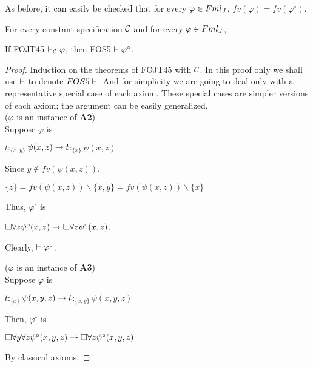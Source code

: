 \qquad As before, it can easily be checked that for every $\varphi \in Fml_{J}$,  $fv(\varphi) = fv(\varphi^{\circ})$.

\begin{pro}
For every constant specification $\mathcal{C}$ and for every $\varphi \in Fml_{J}$,
\begin{center}
If FOJT45 $\vdash_{\mathcal{C}} \varphi$, then FOS5 $\vdash \varphi^{\circ}$.
\end{center}
\end{pro}


\begin{proof}
Induction on the theorems of FOJT45 with $\mathcal{C}$. In this proof only we shall use $\vdash$ to denote $FOS5 \vdash$. And for simplicity we are going to deal only with a representative special case of each axiom. These special cases are simpler versions of each axiom; the argument can be easily generalized.\\



($\varphi$ is an instance of \textbf{A2})\\

\qquad Suppose $\varphi$ is

\begin{center}
$t$$:_{\{x,y\}}$$\psi(x,z) \rightarrow t$$:_{\{x\}}$$\psi(x,z)$
\end{center}
Since $y \notin fv(\psi(x,z))$,

\begin{center}
$\{z\} = fv(\psi(x,z)) \backslash \{x,y\} = fv(\psi(x,z)) \backslash \{x\}$ 
\end{center}
Thus, $\varphi^{\circ}$ is

\begin{center}
$\Box  \forall z \psi^{\circ}(x,z) \rightarrow \Box  \forall z \psi^{\circ}(x,z)$.
\end{center}

Clearly, $\vdash \varphi^{\circ}$.\\
\vspace{5mm}

($\varphi$ is an instance of \textbf{A3})\\

\qquad Suppose $\varphi$ is

\begin{center}
$t$$:_{\{x\}}$$\psi(x,y,z) \rightarrow t$$:_{\{x,y\}}$$\psi(x,y,z)$
\end{center}
Then, $\varphi^{\circ}$ is

\begin{center}
$\Box  \forall y\forall z \psi^{\circ}(x,y,z) \rightarrow \Box  \forall z \psi^{\circ}(x,y,z)$
\end{center}
By classical axioms,


\end{proof}
